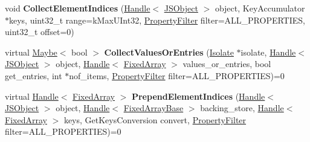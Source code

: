 \begin{DoxyCompactItemize}
\item 
void {\bfseries Collect\+Element\+Indices} (\hyperlink{classv8_1_1internal_1_1_handle}{Handle}$<$ \hyperlink{classv8_1_1internal_1_1_j_s_object}{J\+S\+Object} $>$ object, Key\+Accumulator $\ast$keys, uint32\+\_\+t range=k\+Max\+U\+Int32, \hyperlink{namespacev8_afbf02b6b1152a3e25d7bde90798209ac}{Property\+Filter} filter=A\+L\+L\+\_\+\+P\+R\+O\+P\+E\+R\+T\+I\+ES, uint32\+\_\+t offset=0)\hypertarget{classv8_1_1internal_1_1_elements_accessor_a452f32cac59e2da8ae57ecb52d321a6e}{}\label{classv8_1_1internal_1_1_elements_accessor_a452f32cac59e2da8ae57ecb52d321a6e}

\item 
virtual \hyperlink{classv8_1_1_maybe}{Maybe}$<$ bool $>$ {\bfseries Collect\+Values\+Or\+Entries} (\hyperlink{classv8_1_1internal_1_1_isolate}{Isolate} $\ast$isolate, \hyperlink{classv8_1_1internal_1_1_handle}{Handle}$<$ \hyperlink{classv8_1_1internal_1_1_j_s_object}{J\+S\+Object} $>$ object, \hyperlink{classv8_1_1internal_1_1_handle}{Handle}$<$ \hyperlink{classv8_1_1internal_1_1_fixed_array}{Fixed\+Array} $>$ values\+\_\+or\+\_\+entries, bool get\+\_\+entries, int $\ast$nof\+\_\+items, \hyperlink{namespacev8_afbf02b6b1152a3e25d7bde90798209ac}{Property\+Filter} filter=A\+L\+L\+\_\+\+P\+R\+O\+P\+E\+R\+T\+I\+ES)=0\hypertarget{classv8_1_1internal_1_1_elements_accessor_aae644ad6c7871f39bd2462e006c927ea}{}\label{classv8_1_1internal_1_1_elements_accessor_aae644ad6c7871f39bd2462e006c927ea}

\item 
virtual \hyperlink{classv8_1_1internal_1_1_handle}{Handle}$<$ \hyperlink{classv8_1_1internal_1_1_fixed_array}{Fixed\+Array} $>$ {\bfseries Prepend\+Element\+Indices} (\hyperlink{classv8_1_1internal_1_1_handle}{Handle}$<$ \hyperlink{classv8_1_1internal_1_1_j_s_object}{J\+S\+Object} $>$ object, \hyperlink{classv8_1_1internal_1_1_handle}{Handle}$<$ \hyperlink{classv8_1_1internal_1_1_fixed_array_base}{Fixed\+Array\+Base} $>$ backing\+\_\+store, \hyperlink{classv8_1_1internal_1_1_handle}{Handle}$<$ \hyperlink{classv8_1_1internal_1_1_fixed_array}{Fixed\+Array} $>$ keys, Get\+Keys\+Conversion convert, \hyperlink{namespacev8_afbf02b6b1152a3e25d7bde90798209ac}{Property\+Filter} filter=A\+L\+L\+\_\+\+P\+R\+O\+P\+E\+R\+T\+I\+ES)=0\hypertarget{classv8_1_1internal_1_1_elements_accessor_a4677ff61daa65424b6a93a1de1fae81a}{}\label{classv8_1_1internal_1_1_elements_accessor_a4677ff61daa65424b6a93a1de1fae81a}


\end{DoxyCompactItemize}
